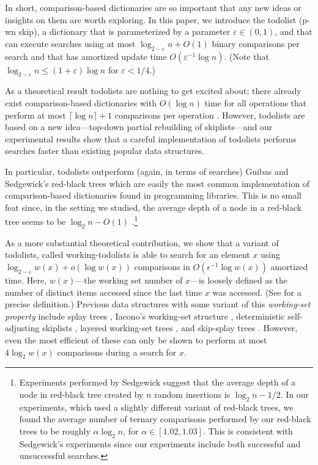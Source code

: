 \documentclass[12pt]{patmorin}
\newcommand{\eps}{\varepsilon}
\begin{document}
In short, comparison-based dictionaries are so important that any
new ideas or insights on them are worth exploring.  In this paper,
we introduce the todolist (p-wn skip),
a dictionary that is parameterized by a parameter $\eps\in(0,1)$,
and that can execute searches using at most $\log_{2-\eps} n + O(1)$
binary comparisons per search and that has amortized update time
$O(\eps^{-1}\log n)$.  (Note that $\log_{2-\eps} n \le (1+\eps)\log n$ for $\eps < 1/4$.)

As a theoretical result todolists are nothing to get excited about; there
already exist comparison-based dictionaries with $O(\log n)$ time for all
operations that perform at most $\lceil\log n\rceil+1$ comparisons per
operation \cite{andersson.lai:fast,fagerberg:binary}. However, todolists
are based on a new idea---top-down partial rebuilding of skiplists---and
our experimental results show that a careful implementation of todolists
performs searches faster than existing popular data structures.

In particular, todolists outperform (again, in terms of searches) Guibas
and Sedgewick's red-black trees \cite{guibas.sedgewick:dichromatic} which are
easily the most common implementation of comparison-based dictionaries
found in programming libraries. This is no small feat since, in the
setting we studied, the average depth of a node in a red-black tree
seems to be $\log_2 n - O(1)$ \cite{sedgewick:left-leaning}.\footnote{Experiments
performed by Sedgewick suggest that the average depth of a node
in red-black tree created by $n$ random insertions is $\log_2 n -
1/2$. In our experiments, which used a slightly different variant of
red-black trees, we found the average number of ternary comparisons
performed by our red-black trees to be roughly $\alpha\log_2 n$, for
$\alpha\in[1.02,1.03]$.  This is consistent with Sedgewick's experiments
since our experiments include both successful and unsuccessful searches.}

As a more substantial theoretical contribution, we show that a
variant of todolists, called working-todolists is able to search for
an element $x$ using $\log_{2-\eps} w(x)+o(\log w(x))$ comparisons
in $O(\epsilon^{-1}\log w(x))$ amortized time.  Here, $w(x)$---the
working set number of $x$---is loosely defined as the number of
distinct items accessed since the last time $x$ was accessed. (See
 for a precise definition.)  Previous data
structures with some variant of this \emph{working-set property}
include splay trees \cite{sleator.tarjan:self-adjusting}, Iacono's
working-set structure \cite{iacono:alternatives,badoiu.cole.ea:unified},
deterministic self-adjusting skiplists \cite{bose.douieb.ea:dynamic},
layered working-set trees \cite{bose.douieb.ea:layered}, and skip-splay
trees \cite{derryberry.sleator:skip-splay}.  However, even the most
efficient of these can only be shown to perform at most $4\log_2 w(x)$
comparisons during a search for $x$.
\end{document}
